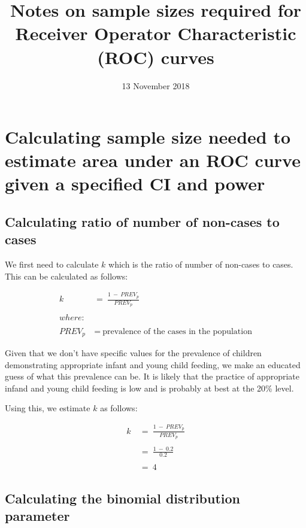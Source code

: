 \documentclass[12pt,a4paper]{article}
\title{Notes on sample sizes required for Receiver Operator Characteristic
(ROC) curves}
\author{}
\date{13 November 2018}
\theoremstyle{definition}
\theoremstyle{definition}
\theoremstyle{definition}
\theoremstyle{remark}
\begin{document}
\maketitle

\hypertarget{calculating-sample-size-needed-to-estimate-area-under-an-roc-curve-given-a-specified-ci-and-power}{%
\section{Calculating sample size needed to estimate area under an ROC
curve given a specified CI and
power}\label{calculating-sample-size-needed-to-estimate-area-under-an-roc-curve-given-a-specified-ci-and-power}}

\hypertarget{calculating-ratio-of-number-of-non-cases-to-cases}{%
\subsection{Calculating ratio of number of non-cases to
cases}\label{calculating-ratio-of-number-of-non-cases-to-cases}}

We first need to calculate \(k\) which is the ratio of number of
non-cases to cases. This can be calculated as follows:

\[ \begin{aligned}
k ~ & = ~ \frac{1 ~ - ~ PREV_p}{PREV_p} \\
\\
where: & \\
\\
PREV_p ~ & = ~ \text{prevalence of the cases in the population}
\end{aligned} \]

Given that we don't have specific values for the prevalence of children
demonstrating appropriate infant and young child feeding, we make an
educated guess of what this prevalence can be. It is likely that the
practice of appropriate infand and young child feeding is low and is
probably at best at the 20\% level.

Using this, we estimate \(k\) as follows:

\[ \begin{aligned} 
k ~ & = ~ \frac{1 ~ - ~ PREV_p}{PREV_p} \\
\\
& = ~ \frac{1 ~ - ~ 0.2}{0.2} \\
\\
& = ~ 4
\end{aligned} \]

\hypertarget{calculating-the-binomial-distribution-parameter}{%
\subsection{Calculating the binomial distribution
parameter}\label{calculating-the-binomial-distribution-parameter}}
\end{document}
